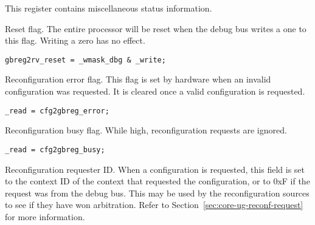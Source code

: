 

This register contains miscellaneous status information.

Reset flag. The entire \rvex{} processor will be reset when the debug bus writes
a one to this flag. Writing a zero has no effect.

\implementation{}
\begin{lstlisting}
gbreg2rv_reset = _wmask_dbg & _write;
\end{lstlisting}

Reconfiguration error flag. This flag is set by hardware when an invalid
configuration was requested. It is cleared once a valid configuration is
requested.

\implementation{}
\begin{lstlisting}
_read = cfg2gbreg_error;
\end{lstlisting}

Reconfiguration busy flag. While high, reconfiguration requests are ignored.

\implementation{}
\begin{lstlisting}
_read = cfg2gbreg_busy;
\end{lstlisting}

Reconfiguration requester ID. When a configuration is requested, this field is
set to the context ID of the context that requested the configuration, or to
0xF if the request was from the debug bus. This may be used by the
reconfiguration sources to see if they have won arbitration. Refer to
Section~\ref{sec:core-ug-reconf-request} for more information.

